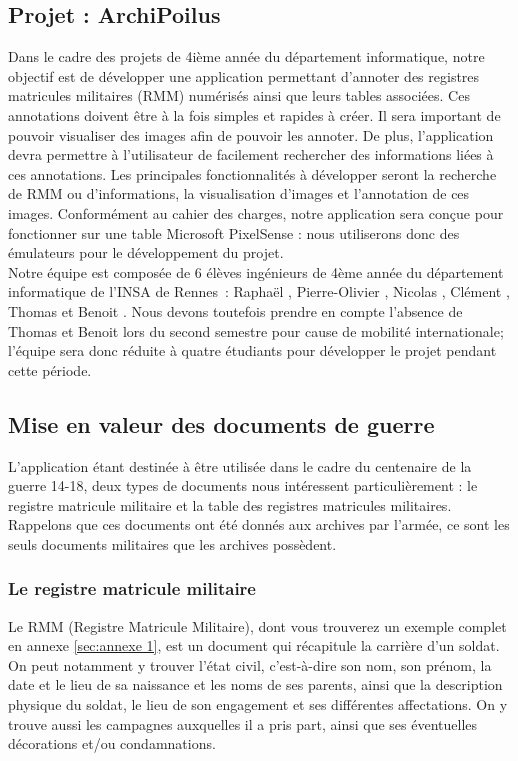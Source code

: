 \documentclass[a4paper]{article}
\begin{document}
\subsection{Projet : ArchiPoilus}

	Dans le cadre des projets de 4ième année du département informatique, notre objectif est de développer une application permettant d’annoter des registres matricules militaires (RMM) numérisés ainsi que leurs tables associées. Ces annotations doivent être à la fois simples et rapides à créer. Il sera important de pouvoir visualiser des images afin de pouvoir les annoter. De plus, l’application devra permettre à l’utilisateur de facilement rechercher des informations liées à ces annotations. Les principales fonctionnalités à développer seront la recherche de RMM ou d’informations, la visualisation d’images et l’annotation de ces images. Conformément au cahier des charges, notre application sera conçue pour fonctionner sur une table Microsoft PixelSense : nous utiliserons donc des émulateurs pour le développement du projet.\\
	
	Notre équipe est composée de 6 élèves ingénieurs de 4ème année du département informatique de l’INSA de Rennes : Raphaël , Pierre-Olivier , Nicolas , Clément , Thomas  et Benoit . Nous devons toutefois prendre en compte l’absence de Thomas et Benoit lors du second semestre pour cause de mobilité internationale; l’équipe sera donc réduite à quatre étudiants pour développer le projet pendant cette période.
	
\subsection{Mise en valeur des documents de guerre}

L'application étant destinée à être utilisée dans le cadre du centenaire de la guerre 14-18, deux types de documents nous intéressent particulièrement : le registre matricule militaire et la table des registres matricules militaires. Rappelons que ces documents ont été donnés aux archives par l'armée, ce sont les seuls documents militaires que les archives possèdent.

\subsubsection{Le registre matricule militaire}
Le RMM (Registre Matricule Militaire), dont vous trouverez un exemple complet en annexe \ref{sec:annexe 1}, est un document qui récapitule la carrière d'un soldat. On peut notamment y trouver l'état civil, c'est-à-dire son nom, son prénom, la date et le lieu de sa naissance et les noms de ses parents, ainsi que la description physique du soldat, le lieu de son engagement et ses différentes affectations. On y trouve aussi les campagnes auxquelles il a pris part, ainsi que ses éventuelles décorations et/ou condamnations.
\end{document}
